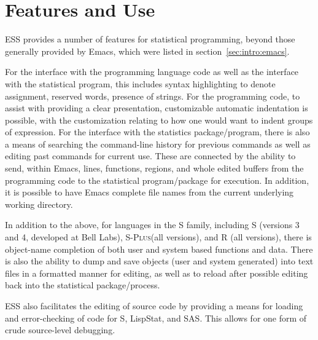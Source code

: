 \documentclass{article}
\newcommand*{\Splus}{\textsc{S-Plus}}
\begin{document}
\section{Features and Use}
\label{sec:basic}


ESS provides a number of features for statistical programming, beyond
those generally provided by Emacs, which were listed in
section~\ref{sec:intro:emacs}.

For the interface with the programming language code as well as the
interface with the statistical program, this includes syntax
highlighting to denote assignment, reserved words, presence of
strings.  For the programming code, to assist with providing a clear
presentation, customizable automatic indentation is possible, with the
customization relating to how one would want to indent groups of
expression.  For the interface with the statistics package/program,
there is also a means of searching the command-line history for
previous commands as well as editing past commands for current use.
These are connected by the ability to send, within Emacs, lines,
functions, regions, and whole edited buffers from the programming code
to the statistical program/package for execution.  In addition, it is
possible to have Emacs complete file names from the current underlying
working directory.

In addition to the above, for languages in the S family, including S
(versions 3 and 4, developed at Bell Labs), \Splus (all versions), and
R (all versions), there is object-name completion of both user and
system based functions and data.  There is also the ability to dump
and save objects (user and system generated) into text files in a
formatted manner for editing, as well as to reload after possible
editing back into the statistical package/process.

ESS also facilitates the editing of source code by providing a means
for loading and error-checking of code for S, LispStat, and SAS.  This
allows for one form of crude source-level debugging.
\end{document}
